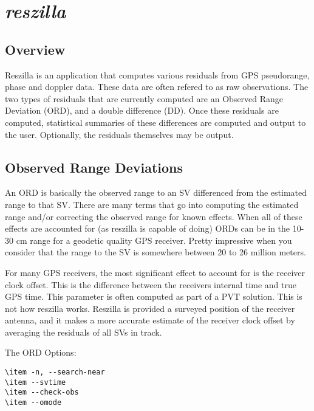 \documentclass{article}
\begin{document}
\section{\emph{reszilla}}
\subsection{Overview}
Reszilla is an application that computes various residuals from GPS
pseudorange, phase and doppler data. These data are often refered to
as raw observations. The two types of residuals that are currently
computed are an Observed Range Deviation (ORD), and a double
difference (DD). Once these residuals are computed, statistical
summaries of these differences are computed and output to the
user. Optionally, the residuals themselves may be output.

\subsection{Observed Range Deviations}
An ORD is basically the observed range to an SV differenced from the
estimated range to that SV. There are many terms that go into
computing the estimated range and/or correcting the observed range for
known effects. When all of these effects are accounted for (as
reszilla is capable of doing) ORDs can be in the 10-30 cm range for a
geodetic quality GPS receiver. Pretty impressive when you consider
that the range to the SV is somewhere between 20 to 26 million meters.

For many GPS receivers, the most significant effect to account for is the receiver
clock offset. This is the difference between the receivers internal time and true
GPS time. This parameter is often computed as part of a PVT solution. This is not
how reszilla works. Reszilla is provided a surveyed position of the receiver
antenna, and it makes a more accurate estimate of the receiver clock offset by
averaging the residuals of all SVs in track.


The ORD Options:

\begin{verbatim}
\item -n, --search-near
\item --svtime
\item --check-obs
\item --omode
\end{verbatim}
\end{document}
